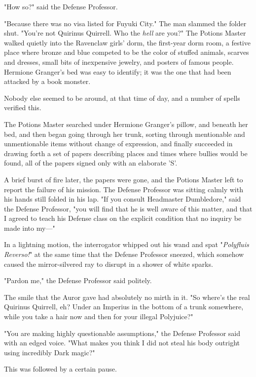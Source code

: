 "How so?" said the Defense Professor.

"Because there was no visa listed for Fuyuki City." The man slammed the folder 
shut. "You're not Quirinus Quirrell. Who the \emph{hell} are you?"
\sbreak
The Potions Master walked quietly into the Ravenclaw girls' dorm, the 
first-year dorm room, a festive place where bronze and blue competed to be the 
color of stuffed animals, scarves and dresses, small bits of inexpensive 
jewelry, and posters of famous people. Hermione Granger's bed was easy to 
identify; it was the one that had been attacked by a book monster.

Nobody else seemed to be around, at that time of day, and a number of spells 
verified this.

The Potions Master searched under Hermione Granger's pillow, and beneath her 
bed, and then began going through her trunk, sorting through mentionable and 
unmentionable items without change of expression, and finally succeeded in 
drawing forth a set of papers describing places and times where bullies would 
be found, all of the papers signed only with an elaborate 'S'.

A brief burst of fire later, the papers were gone, and the Potions Master left 
to report the failure of his mission.
\sbreak
The Defense Professor was sitting calmly with his hands still folded in his 
lap. "If you consult Headmaster Dumbledore," said the Defense Professor, "you 
will find that he is well aware of this matter, and that I agreed to teach his 
Defense class on the explicit condition that no inquiry be made into my---"

In a lightning motion, the interrogator whipped out his wand and spat 
"\emph{Polyfluis Reverso!}" at the same time that the Defense Professor 
sneezed, which somehow caused the mirror-silvered ray to disrupt in a shower of 
white sparks.

"Pardon me," the Defense Professor said politely.

The smile that the Auror gave had absolutely no mirth in it. "So where's the 
real Quirinus Quirrell, eh? Under an Imperius in the bottom of a trunk 
somewhere, while you take a hair now and then for your illegal Polyjuice?"

"You are making highly questionable assumptions," the Defense Professor said 
with an edged voice. "What makes you think I did not steal his body outright 
using incredibly Dark magic?"

This was followed by a certain pause.

